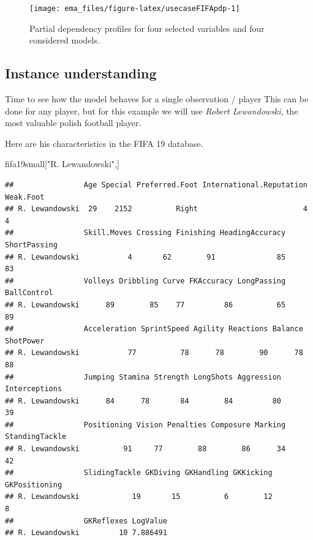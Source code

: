 \documentclass[12pt,]{krantz}
\newenvironment{Shaded}{\begin{snugshade}}{\end{snugshade}}
\newcommand{\NormalTok}[1]{#1}
\newcommand{\StringTok}[1]{\textcolor[rgb]{0.31,0.60,0.02}{#1}}
\begin{document}
\begin{figure}

{\centering \texttt{[image: ema\_files/figure-latex/usecaseFIFApdp-1]} 

}

\caption{Partial dependency profiles for four selected variables and four considered models.}\label{fig:usecaseFIFApdp}
\end{figure}

\hypertarget{instance-understanding}{%
\subsection{Instance understanding}\label{instance-understanding}}

Time to see how the model behaves for a single observation / player
This can be done for any player, but for this example we will use \emph{Robert Lewandowski}, the most valuable polish football player.

Here are his characteristics in the FIFA 19 database.

\begin{Shaded}
\begin{Highlighting}[]
\NormalTok{fifa19small[}\StringTok{"R. Lewandowski"}\NormalTok{,]}
\end{Highlighting}
\end{Shaded}

\begin{verbatim}
##                Age Special Preferred.Foot International.Reputation Weak.Foot
## R. Lewandowski  29    2152          Right                        4         4
##                Skill.Moves Crossing Finishing HeadingAccuracy ShortPassing
## R. Lewandowski           4       62        91              85           83
##                Volleys Dribbling Curve FKAccuracy LongPassing BallControl
## R. Lewandowski      89        85    77         86          65          89
##                Acceleration SprintSpeed Agility Reactions Balance ShotPower
## R. Lewandowski           77          78      78        90      78        88
##                Jumping Stamina Strength LongShots Aggression Interceptions
## R. Lewandowski      84      78       84        84         80            39
##                Positioning Vision Penalties Composure Marking StandingTackle
## R. Lewandowski          91     77        88        86      34             42
##                SlidingTackle GKDiving GKHandling GKKicking GKPositioning
## R. Lewandowski            19       15          6        12             8
##                GKReflexes LogValue
## R. Lewandowski         10 7.886491
\end{verbatim}
\end{document}
